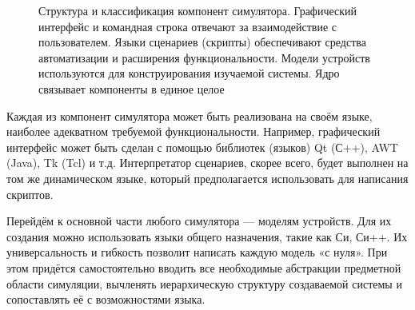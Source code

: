 \begin{figure}[h]
    \caption[Структура и классификация компонент симулятора]{Структура и классификация компонент симулятора. Графический интерфейс и командная строка отвечают за взаимодействие с пользователем. Языки сценариев (скрипты) обеспечивают средства автоматизации и расширения функциональности. Модели устройств используются для конструирования изучаемой системы. Ядро связывает компоненты в единое целое}
    \label{fig:breakdown}
\end{figure}

Каждая из компонент симулятора может быть реализована на своём языке, наиболее адекватном требуемой функциональности. Например, графический интерфейс может быть сделан с помощью библиотек (языков) Qt (С++), AWT (Java), Tk (Tcl) и т.д. Интерпретатор сценариев, скорее всего, будет выполнен на том же динамическом языке, который предполагается использовать для написания скриптов.

Перейдём к основной части любого симулятора --- моделям устройств. Для их создания можно использовать языки общего назначения, такие как Си, Си++. Их универсальность и гибкость позволит написать каждую модель «с нуля». При этом придётся самостоятельно вводить все необходимые абстракции предметной области симуляции, вычленять иерархическую структуру создаваемой системы и сопоставлять её с возможностями языка.

